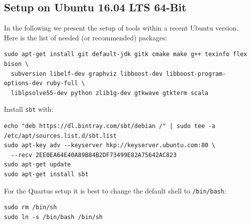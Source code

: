 \documentclass[a4paper,fontsize=10pt,twoside,DIV15,BCOR12mm,headinclude=true,footinclude=false,pagesize,bibtotoc]{scrbook}
\newcommand{\code}[1]{{\texttt{#1}}}
\begin{document}
\subsection{Setup on Ubuntu 16.04 LTS 64-Bit}

In the following we present the setup of tools within a recent Ubuntu version.
Here is the list of needed (or recommended) packages:

\begin{verbatim}
sudo apt-get install git default-jdk gitk cmake make g++ texinfo flex bison \
  subversion libelf-dev graphviz libboost-dev libboost-program-options-dev ruby-full \
  liblpsolve55-dev python zlib1g-dev gtkwave gtkterm scala
\end{verbatim}

Install \code{sbt} with:

\begin{verbatim}
echo "deb https://dl.bintray.com/sbt/debian /" | sudo tee -a /etc/apt/sources.list.d/sbt.list
sudo apt-key adv --keyserver hkp://keyserver.ubuntu.com:80 \
  --recv 2EE0EA64E40A89B84B2DF73499E82A75642AC823
sudo apt-get update
sudo apt-get install sbt
\end{verbatim}

For the Quartus setup it is best to change the default shell to \code{/bin/bash}:

\begin{verbatim}
sudo rm /bin/sh
sudo ln -s /bin/bash /bin/sh
\end{verbatim}
\end{document}
